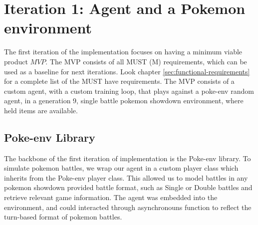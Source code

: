 \section{Iteration 1: Agent and a Pokemon environment} 
\label{sec:Iteration-1-Agent-Environment}

The first iteration of the implementation focuses on having a minimum viable product \(MVP\). The MVP
consists of all MUST (M) requirements, which can be used as a baseline for next iterations.
Look chapter \ref{sec:functional-requirements} for a complete list of the MUST have requirements.
The MVP consists of a custom agent, with a custom training loop, that plays against a poke-env random agent,
in a generation 9, single battle pokemon showdown environment, where held items are available. 

\subsection{Poke-env Library}
The backbone of the first iteration of implementation is the Poke-env library. 
To simulate pokemon battles, we wrap our agent in a custom player class which inherits from the
Poke-env player class. This allowed us to model battles in any pokemon showdown 
provided battle format, such as Single or Double battles and retrieve relevant game information.
The agent was embedded into the environment, and could interacted through asynchronouns function
to reflect the turn-based format of pokemon battles.


